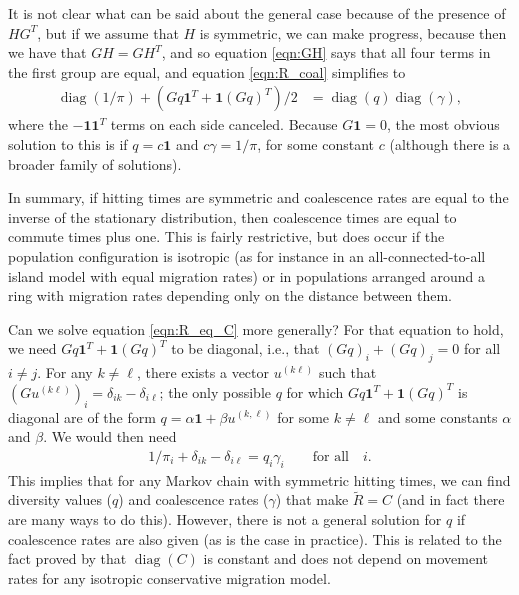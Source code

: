 \documentclass{article}
\newcommand{\comdist}{\widetilde{R}}
\DeclareMathOperator{\diag}{\mathop{\mbox{diag}}}
\newcommand{\bone}{\mathbf{1}}
\begin{document}
It is not clear what can be said about the general case because of the presence of $HG^T$,
but if we assume that $H$ is symmetric, we can make progress,
because then we have that $GH = GH^T$, 
and so equation \eqref{eqn:GH} says that all four terms in the first group are equal,
and equation \eqref{eqn:R_coal} simplifies to
\begin{align} \label{eqn:R_eq_C}
    \diag(1/\pi) + (Gq \bone^T + \bone (Gq)^T)/2
    &=
    \diag(q) \diag(\gamma) ,
\end{align}
where the $-\bone \bone^T$ terms on each side canceled.
Because $G\bone=0$,
the most obvious solution to this is if $q = c \bone$ and $c \gamma = 1/\pi$, for some constant $c$
(although there is a broader family of solutions).

In summary, if hitting times are symmetric
and coalescence rates are equal to the inverse of the stationary distribution,
then coalescence times are equal to commute times plus one.
This is fairly restrictive, 
but does occur if the population configuration is isotropic
(as for instance in an all-connected-to-all island model with equal migration rates)
or in populations arranged around a ring
with migration rates depending only on the distance between them.

Can we solve equation \eqref{eqn:R_eq_C} more generally?
For that equation to hold, we need $Gq \bone^T + \bone (Gq)^T$ to be diagonal,
i.e., that $(Gq)_i + (Gq)_j = 0$ for all $i \neq j$.
For any $k \neq \ell$, there exists a vector $u^{(k\ell)}$ such that $(Gu^{(k\ell)})_i = \delta_{ik} - \delta_{i\ell}$;
the only possible $q$ for which $Gq \bone^T + \bone (Gq)^T$ is diagonal
are of the form $q = \alpha \bone + \beta u^{(k,\ell)}$ for some $k \neq \ell$ and some constants $\alpha$ and $\beta$.
We would then need
\begin{align}
    1/\pi_i + \delta_{ik} - \delta_{i\ell} = q_i \gamma_i \qquad \text{for all} \quad i.
\end{align}
This implies that for any Markov chain with symmetric hitting times,
we can find diversity values ($q$) and coalescence rates ($\gamma$) that make $\comdist = C$
(and in fact there are many ways to do this).
However, there is not a general solution for $q$ if coalescence rates are also given (as is the case in practice).
This is related to the fact proved by \citet{strobeck1987average} 
that $\diag(C)$ is constant and does not depend on movement rates
for any isotropic conservative migration model.
\end{document}

